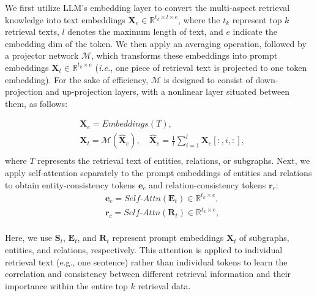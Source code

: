 We first utilize LLM's embedding layer to convert the multi-aspect retrieval knowledge into text embeddings $\boldsymbol{X}_{e} \in \mathbb{R}^{t_k \times l \times e}$, where the $t_k$ represent top $k$ retrieval texts, $l$ denotes the maximum length of text, and $e$ indicate the embedding dim of the token. We then apply an averaging operation, followed by a projector network \(\mathcal{M}\), which transforms these embeddings into prompt embeddings $\boldsymbol{X}_{t} \in \mathbb{R}^{t_k \times e}$ (\textit{i.e.}, one piece of retrieval text is projected to one token embedding). For the sake of efficiency, $\mathcal{M}$ is designed to consist of down-projection and up-projection layers, with a nonlinear layer situated between them, as follows:

\begin{equation}
\begin{aligned}
    &\boldsymbol{X}_{e} = Embeddings({T}), \\
    &\boldsymbol{X}_{t} = \mathcal{M}(\hat{\boldsymbol{X}}_{e}), \quad \hat{\boldsymbol{X}}_{e} =  \frac{1}{l}\sum\nolimits_{i=1}^{l} \boldsymbol{X}_e[:,i,:],\\
\end{aligned}
\end{equation}
where $T$ represents the retrieval text of entities, relations, or subgraphs.
Next, we apply self-attention separately to the prompt embeddings of entities and relations to obtain entity-consistency tokens $\boldsymbol{e}_{c} $ and relation-consistency tokens $\boldsymbol{r}_{c} $:
\begin{equation}
\begin{aligned}
    &\boldsymbol{e}_{c} = Self\text{-}Attn(\boldsymbol{E}_{t}) \in \mathbb{R}^{t_k \times e}, \\
   &\boldsymbol{r}_{c} = Self\text{-}Attn(\boldsymbol{R}_{t}) \in \mathbb{R}^{t_k \times e}, \\
\end{aligned}
\end{equation}

Here, we use $\boldsymbol{S}_{t}$, $\boldsymbol{E}_{t}$, and $\boldsymbol{R}_{t}$ represent prompt embeddings $\boldsymbol{X}_{t}$ of subgraphs, entities, and relations, respectively.
This attention is applied to individual retrieval text (e.g., one sentence) rather than individual tokens to learn the correlation and consistency between different retrieval information and their importance within the entire top $k$ retrieval data.

